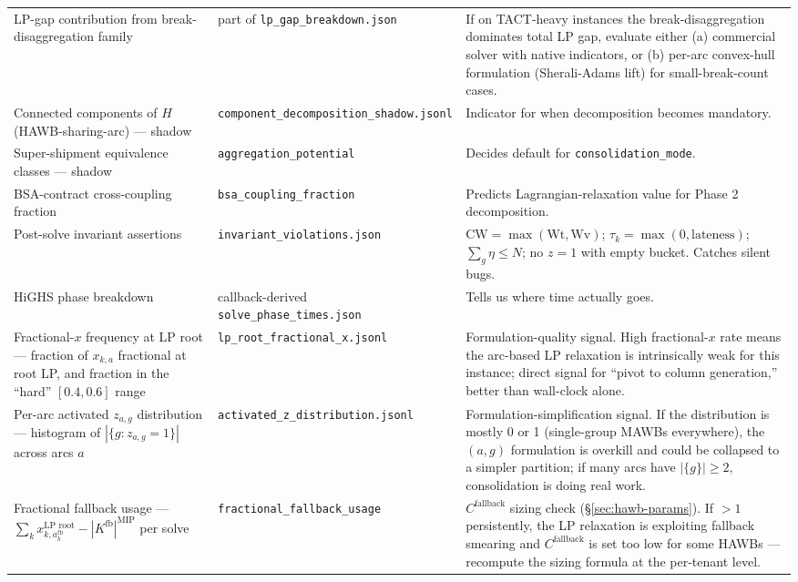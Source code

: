 \documentclass[11pt,a4paper]{article}
\theoremstyle{definition}
\begin{document}
\begin{table}[H]
\begin{tabular}{p{4.7cm}p{4.0cm}p{6.2cm}}
LP-gap contribution from break-disaggregation family & part of \texttt{lp\_gap\_breakdown.json} & If on TACT-heavy instances the break-disaggregation dominates total LP gap, evaluate either (a) commercial solver with native indicators, or (b) per-arc convex-hull formulation (Sherali-Adams lift) for small-break-count cases. \\
Connected components of $H$ (HAWB-sharing-arc) --- shadow & \texttt{component\_decomposition\_shadow.jsonl} & Indicator for when decomposition becomes mandatory. \\
Super-shipment equivalence classes --- shadow & \texttt{aggregation\_potential} & Decides default for \texttt{consolidation\_mode}. \\
BSA-contract cross-coupling fraction & \texttt{bsa\_coupling\_fraction} & Predicts Lagrangian-relaxation value for Phase 2 decomposition. \\
Post-solve invariant assertions & \texttt{invariant\_violations.json} & $\text{CW} = \max(\text{Wt}, \text{Wv})$; $\tau_k = \max(0, \text{lateness})$; $\sum_g \eta \leq N$; no $z = 1$ with empty bucket. Catches silent bugs. \\
HiGHS phase breakdown & callback-derived \texttt{solve\_phase\_times.json} & Tells us where time actually goes. \\
Fractional-$x$ frequency at LP root --- fraction of $x_{k,a}$ fractional at root LP, and fraction in the ``hard'' $[0.4, 0.6]$ range & \texttt{lp\_root\_fractional\_x.jsonl} & Formulation-quality signal. High fractional-$x$ rate means the arc-based LP relaxation is intrinsically weak for this instance; direct signal for ``pivot to column generation,'' better than wall-clock alone. \\
Per-arc activated $z_{a,g}$ distribution --- histogram of $|\{g : z_{a,g} = 1\}|$ across arcs $a$ & \texttt{activated\_z\_distribution.jsonl} & Formulation-simplification signal. If the distribution is mostly 0 or 1 (single-group MAWBs everywhere), the $(a, g)$ formulation is overkill and could be collapsed to a simpler partition; if many arcs have $|\{g\}| \geq 2$, consolidation is doing real work. \\
Fractional fallback usage --- $\sum_k x_{k, a^{\text{fb}}_k}^{\text{LP root}} - |K^{\text{fb}}|^{\text{MIP}}$ per solve & \texttt{fractional\_fallback\_usage} & $C^{\text{fallback}}$ sizing check (\S\ref{sec:hawb-params}). If $> 1$ persistently, the LP relaxation is exploiting fallback smearing and $C^{\text{fallback}}$ is set too low for some HAWBs --- recompute the sizing formula at the per-tenant level. \\
\bottomrule
\end{tabular}
\end{table}
\end{document}
